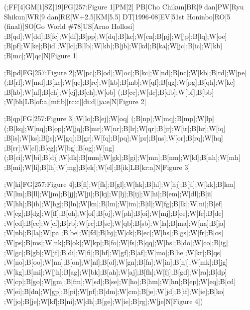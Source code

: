 \newpage

(;FF{[}4{]}GM{[}1{]}SZ{[}19{]}FG{[}257:Figure 1{]}PM{[}2{]} PB{[}Cho
Chikun{]}BR{[}9 dan{]}PW{[}Ryu Shikun{]}WR{[}9
dan{]}RE{[}W+2.5{]}KM{[}5.5{]} DT{[}1996-08{]}EV{[}51st Honinbo{]}RO{[}5
(final){]}SO{[}Go World \#78{]}US{[}Arno Hollosi{]}
;B{[}qd{]};W{[}dd{]};B{[}fc{]};W{[}df{]};B{[}pp{]};W{[}dq{]};B{[}kc{]};W{[}cn{]};B{[}pj{]};W{[}jp{]};B{[}lq{]};W{[}oe{]}
;B{[}pf{]};W{[}ke{]};B{[}id{]};W{[}lc{]};B{[}lb{]};W{[}kb{]};B{[}jb{]};W{[}kd{]};B{[}ka{]};W{[}jc{]};B{[}ic{]};W{[}kb{]}
;B{[}mc{]};W{[}qc{]}N{[}Figure 1{]}

;B{[}pd{]}FG{[}257:Figure
2{]};W{[}pc{]};B{[}od{]};W{[}oc{]};B{[}kc{]};W{[}nd{]};B{[}nc{]};W{[}kb{]};B{[}rd{]};W{[}pe{]}
(;B{[}rf{]};W{[}md{]};B{[}kc{]};W{[}qe{]};B{[}re{]};W{[}kb{]};B{[}mb{]};W{[}qf{]};B{[}qg{]};W{[}pg{]};B{[}qh{]};W{[}kc{]}
;B{[}hb{]};W{[}nf{]};B{[}ch{]};W{[}cj{]};B{[}eh{]};W{[}ob{]}
(;B{[}cc{]};W{[}dc{]};B{[}db{]};W{[}bf{]};B{[}bb{]}
;W{[}bh{]}LB{[}of:a{]}{[}mf:b{]}{[}rc:c{]}{[}di:d{]}{[}ja:e{]}N{[}Figure
2{]}

;B{[}qp{]}FG{[}257:Figure 3{]};W{[}lo{]};B{[}ej{]};W{[}oq{]}
(;B{[}np{]};W{[}mq{]};B{[}mp{]};W{[}lp{]}
(;B{[}kq{]};W{[}nq{]};B{[}op{]};W{[}jq{]};B{[}mr{]};W{[}nr{]};B{[}lr{]};W{[}qr{]};B{[}jr{]};W{[}ir{]};B{[}hr{]};W{[}iq{]}
;B{[}is{]};W{[}ks{]};B{[}js{]};W{[}gq{]};B{[}gr{]};W{[}fq{]};B{[}pq{]};W{[}pr{]};B{[}ns{]};W{[}or{]};B{[}rq{]};W{[}hq{]}
;B{[}rr{]};W{[}cl{]};B{[}cg{]};W{[}bg{]};B{[}og{]};W{[}ng{]}
(;B{[}ci{]};W{[}bi{]};B{[}dj{]};W{[}dk{]};B{[}mm{]};W{[}gk{]};B{[}gi{]};W{[}mn{]};B{[}nm{]};W{[}kl{]};B{[}nh{]};W{[}mh{]}
;B{[}mi{]};W{[}li{]};B{[}lh{]};W{[}mg{]};B{[}ek{]};W{[}el{]};B{[}ik{]}LB{[}kr:a{]}N{[}Figure
3{]}

;W{[}ki{]}FG{[}257:Figure
4{]};B{[}fl{]};W{[}fk{]};B{[}gl{]};W{[}hk{]};B{[}hl{]};W{[}hj{]};B{[}jl{]};W{[}kk{]};B{[}km{]}
;W{[}lm{]};B{[}ll{]};W{[}jm{]};B{[}jj{]};W{[}ji{]};B{[}kj{]};W{[}lj{]};B{[}ij{]};W{[}hi{]};B{[}em{]};W{[}dl{]};B{[}ii{]}
;W{[}hh{]};B{[}ih{]};W{[}hg{]};B{[}ln{]};W{[}kn{]};B{[}lm{]};W{[}im{]};B{[}il{]};W{[}fg{]};B{[}lk{]};W{[}ni{]};B{[}ef{]}
;W{[}eg{]};B{[}dg{]};W{[}ff{]};B{[}oh{]};W{[}of{]};B{[}oj{]};W{[}ph{]};B{[}oi{]};W{[}mj{]};B{[}ee{]};W{[}fe{]};B{[}de{]}
;W{[}ed{]};B{[}ce{]};W{[}cf{]};B{[}rb{]};W{[}rc{]};B{[}sc{]};W{[}qb{]};B{[}sb{]};W{[}la{]};B{[}ma{]};W{[}na{]};B{[}ja{]}
;W{[}nb{]};B{[}la{]};W{[}pa{]};B{[}be{]};W{[}fd{]};B{[}bj{]};W{[}ck{]};B{[}ec{]};W{[}hs{]};B{[}gs{]};W{[}fr{]};B{[}os{]}
;W{[}ps{]};B{[}ms{]};W{[}nk{]};B{[}ok{]};W{[}kp{]};B{[}fo{]};W{[}fs{]};B{[}qq{]};W{[}hs{]};B{[}do{]};W{[}co{]};B{[}ig{]}
;W{[}gc{]};B{[}gb{]};W{[}jf{]};B{[}di{]};W{[}fi{]};B{[}hf{]};W{[}gf{]};B{[}af{]};W{[}mo{]};B{[}he{]};W{[}kr{]};B{[}qs{]}
;W{[}no{]};B{[}oo{]};W{[}nn{]};B{[}on{]};W{[}nl{]};B{[}ol{]};W{[}gn{]};B{[}fn{]};W{[}in{]};B{[}nj{]};W{[}mk{]};B{[}jg{]}
;W{[}kg{]};B{[}mi{]};W{[}jh{]};B{[}ag{]};W{[}bk{]};B{[}ah{]};W{[}aj{]};B{[}fh{]};W{[}fj{]};B{[}gd{]};W{[}ra{]};B{[}dp{]}
;W{[}cp{]};B{[}go{]};W{[}gm{]};B{[}fm{]};W{[}sd{]};B{[}se{]};W{[}ho{]};B{[}hm{]};W{[}hn{]};B{[}ep{]};W{[}eq{]};B{[}cd{]}
;W{[}ei{]};B{[}dn{]};W{[}gp{]};B{[}pi{]};W{[}pf{]};B{[}dm{]};W{[}cm{]};B{[}je{]};W{[}jd{]};B{[}if{]};W{[}ie{]};B{[}ko{]}
;W{[}jo{]};B{[}je{]};W{[}kf{]};B{[}ni{]};W{[}dh{]};B{[}ge{]};W{[}ie{]};B{[}rg{]};W{[}je{]}N{[}Figure
4{]})

